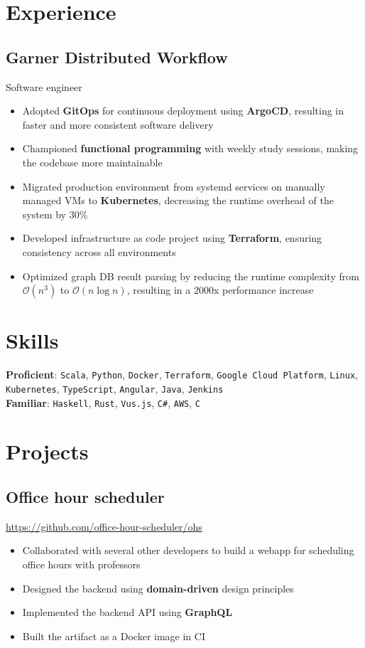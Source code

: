 \documentclass[letterpaper,12pt,oneside]{article}
\newcommand{\smallurl}[1]{\footnotesize{\url{#1}}\normalsize}
\begin{document}
\section*{Experience}
\subsection*{Garner Distributed Workflow \hfill {}}
Software engineer
\begin{itemize}
    \setlength\itemsep{0em}
    \item Adopted \textbf{GitOps} for continuous deployment using \textbf{ArgoCD}, resulting in faster and more consistent software delivery
    \item Championed \textbf{functional programming} with weekly study sessions, making the codebase more maintainable
    \item Migrated production environment from systemd services on manually managed VMs to \textbf{Kubernetes}, decreasing the runtime overhead of the system by 30\%
    \item Developed infrastructure as code project using \textbf{Terraform}, ensuring consistency across all environments
    \item Optimized graph DB result parsing by reducing the runtime complexity from $\mathcal{O}(n^3)$ to $\mathcal{O}(n\log{}n)$, resulting in a 2000x performance increase
\end{itemize}

\section*{Skills}
\large{}
\textbf{Proficient}:
\texttt{Scala}, \texttt{Python}, \texttt{Docker}, \texttt{Terraform}, \texttt{Google Cloud Platform}, \texttt{Linux},
\texttt{Kubernetes}, \texttt{TypeScript}, \texttt{Angular}, \texttt{Java}, \texttt{Jenkins} \\
\textbf{Familiar}:
\texttt{Haskell}, \texttt{Rust}, \texttt{Vus.js}, \texttt{C\#}, \texttt{AWS}, \texttt{C}
\normalsize{}

\section*{Projects}

\subsection*{Office hour scheduler \hfill {}}
\smallurl{https://github.com/office-hour-scheduler/ohs}
\begin{itemize}
    \setlength\itemsep{0em}
    \item Collaborated with several other developers to build a webapp for scheduling office hours with professors
    \item Designed the backend using \textbf{domain-driven} design principles
    \item Implemented the backend API using \textbf{GraphQL}
    \item Built the artifact as a Docker image in CI
\end{itemize}
\end{document}
